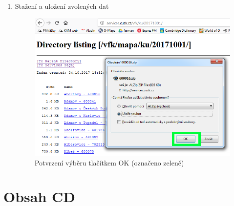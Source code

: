 \begin{enumerate}
  \item{Stažení a uložení zvolených dat}
  \begin{figure}[H]
	 \centering
      \includegraphics[width=15cm]{./pictures/stazeni_dat_5kr.png}
      \caption{Potvrzení výběru tlačítkem OK (označeno zeleně)}
      \label{fig:5kr_stazeni}
  \end{figure}
  \end{enumerate}
  
  \section{Obsah CD}

